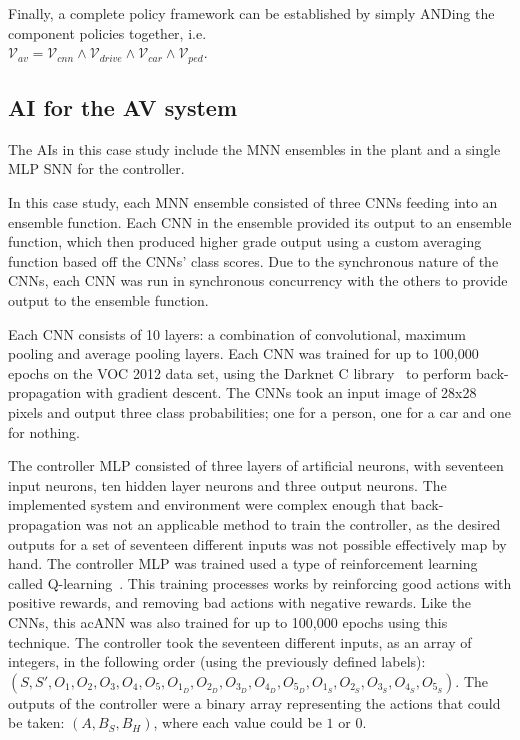 Finally, a complete policy framework can be established by simply ANDing the component policies together, i.e. \\ $\mathcal{V}_{av} = \mathcal{V}_{cnn} \wedge \mathcal{V}_{drive} \wedge \mathcal{V}_{car} \wedge \mathcal{V}_{ped}$.

\subsection{\acf{AI} for the \acf{AV} system}

The \acp{AI} in this case study include the \ac{MNN} ensembles in the plant and a single \ac{MLP} \ac{SNN} for the controller.

In this case study, each \ac{MNN} ensemble consisted of three \acp{CNN} feeding into an ensemble function.
Each \ac{CNN} in the ensemble provided its output to an ensemble function, which then produced higher grade output using a custom averaging function based off the \acp{CNN}' class scores.
Due to the synchronous nature of the \acp{CNN}, each \ac{CNN} was run in synchronous concurrency with the others to provide output to the ensemble function.
	
Each \ac{CNN} consists of 10 layers: a combination of convolutional, maximum pooling and average pooling layers.
Each \ac{CNN} was trained for up to 100,000 epochs on the \acf{VOC} 2012 data set, using the Darknet C library~\cite{darknet13} to perform back-propagation with gradient descent.
The \acp{CNN} took an input image of 28x28 pixels and output three class probabilities; one for a person, one for a car and one for nothing.

The controller \ac{MLP} consisted of three layers of artificial neurons, with seventeen input neurons, ten hidden layer neurons and three output neurons.
The implemented system and environment were complex enough that back-propagation was not an applicable method to train the controller, as the desired outputs for a set of seventeen different inputs was not possible effectively map by hand.
The controller \ac{MLP} was trained used a type of reinforcement learning called Q-learning~\cite{qlearning2010}.
This training processes works by reinforcing good actions with positive rewards, and removing bad actions with negative rewards.
Like the \acp{CNN}, this ac{ANN} was also trained for up to 100,000 epochs using this technique.
The controller took the seventeen different inputs, as an array of integers, in the following order (using the previously defined labels): $(S, S', O_1, O_2, O_3, O_4, O_5, O_{1_D}, O_{2_D}, O_{3_D}, O_{4_D}, O_{5_D}, O_{1_S}, O_{2_S}, O_{3_S}, O_{4_S}, O_{5_S})$.
The outputs of the controller were a binary array representing the actions that could be taken: $(A, B_S, B_H)$, where each value could be $1$ or $0$.

